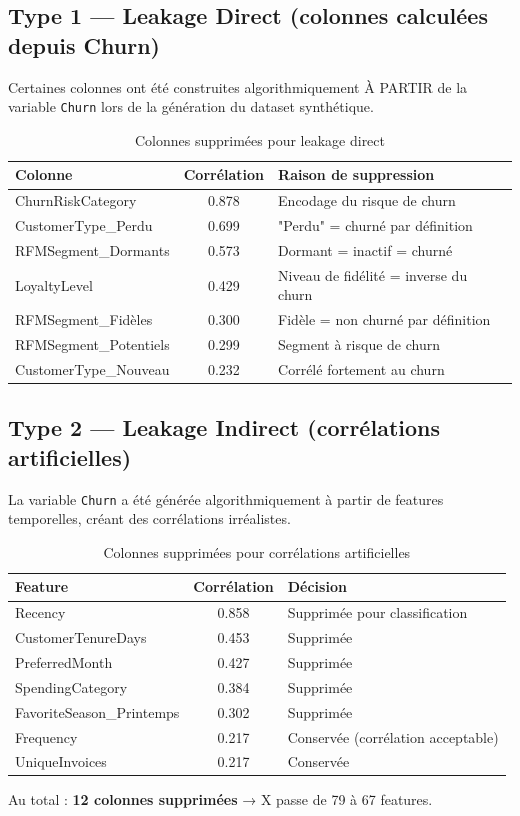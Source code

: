 \documentclass[11pt,a4paper]{article}
\begin{document}
\subsection{Type 1 — Leakage Direct (colonnes calculées depuis Churn)}
Certaines colonnes ont été construites algorithmiquement À PARTIR de la variable \texttt{Churn} lors de la génération du dataset synthétique.
\begin{table}[H]
	\centering
	\caption{Colonnes supprimées pour leakage direct}
	\label{tab:leakage_direct}
	\begin{tabular}{|l|c|l|}
		\hline
		\textbf{Colonne} & \textbf{Corrélation} & \textbf{Raison de suppression} \\
		\hline
		ChurnRiskCategory & 0.878 & Encodage du risque de churn \\
		CustomerType\_Perdu & 0.699 & "Perdu" = churné par définition \\
		RFMSegment\_Dormants & 0.573 & Dormant = inactif = churné \\
		LoyaltyLevel & 0.429 & Niveau de fidélité = inverse du churn \\
		RFMSegment\_Fidèles & 0.300 & Fidèle = non churné par définition \\
		RFMSegment\_Potentiels & 0.299 & Segment à risque de churn \\
		CustomerType\_Nouveau & 0.232 & Corrélé fortement au churn \\
		\hline
	\end{tabular}
\end{table}
\subsection{Type 2 — Leakage Indirect (corrélations artificielles)}
La variable \texttt{Churn} a été générée algorithmiquement à partir de features temporelles, créant des corrélations irréalistes.

\begin{table}[H]
	\centering
	\caption{Colonnes supprimées pour corrélations artificielles}
	\label{tab:leakage_indirect}
	\begin{tabular}{|l|c|l|}
		\hline
		\textbf{Feature} & \textbf{Corrélation} & \textbf{Décision} \\
		\hline
		Recency & 0.858 & Supprimée pour classification \\
		CustomerTenureDays & 0.453 & Supprimée \\
		PreferredMonth & 0.427 & Supprimée \\
		SpendingCategory & 0.384 & Supprimée \\
		FavoriteSeason\_Printemps & 0.302 & Supprimée \\
		Frequency & 0.217 & Conservée (corrélation acceptable) \\
		UniqueInvoices & 0.217 & Conservée \\
		\hline
	\end{tabular}
\end{table}
Au total : \textbf{12 colonnes supprimées} → X passe de 79 à 67 features.
\end{document}
